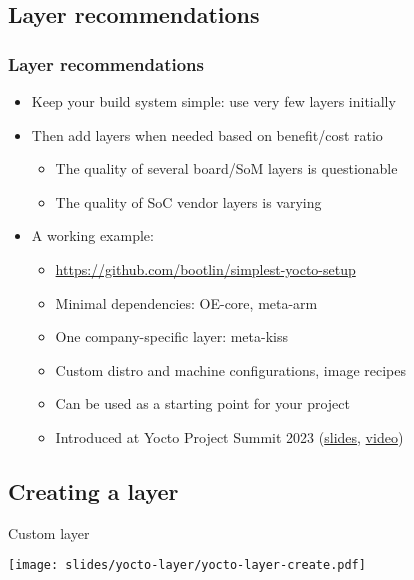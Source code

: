 \subsection{Layer recommendations}

\begin{frame}
  \frametitle{Layer recommendations}
  \begin{itemize}
  \item Keep your build system simple: use very few layers initially
  \item Then add layers when needed based on benefit/cost ratio
    \begin{itemize}
    \item The quality of several board/SoM layers is questionable
    \item The quality of SoC vendor layers is varying
    \end{itemize}
  \item A working example:
    \begin{itemize}
    \item \url{https://github.com/bootlin/simplest-yocto-setup}
    \item Minimal dependencies: OE-core, meta-arm
    \item One company-specific layer: meta-kiss
    \item Custom distro and machine configurations, image recipes
    \item Can be used as a starting point for your project
    \item Introduced at Yocto Project Summit 2023
      (\href{https://bootlin.com/pub/conferences/2023/yp-summit/ceresoli-simple-layer/ceresoli-simple-layer.pdf}{slides},
      \href{https://youtu.be/zCMHy2PjsaM}{video})
    \end{itemize}
  \end{itemize}
\end{frame}

\subsection{Creating a layer}

\begin{frame}{Custom layer}
  \begin{center}
    \texttt{[image: slides/yocto-layer/yocto-layer-create.pdf]}
  \end{center}
\end{frame}

